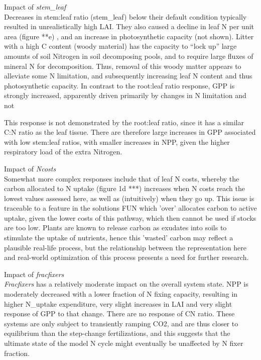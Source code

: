 \documentclass[draft,linenumbers]{agujournal}
\begin{document}
Impact of \emph{stem\_leaf}\\
Decreases in stem:leaf ratio (stem\_leaf) below their default condition typically resulted in unrealistically high LAI. They also caused a decline in leaf N per unit area (figure **e) , and an increase in photosynthetic capacity (not shown). Litter with a high C content (woody material) has the capacity to “lock up” large amounts of soil Nitrogen in soil decomposing pools, and to require large fluxes of mineral N for decomposition. Thus, removal of this woody matter appears to alleviate some N limitation, and subsequently increasing leaf N content and thus photosynthetic capacity.  In contrast to the root:leaf ratio response, GPP is strongly increased, apparently driven primarily by changes in N limitation and not 

This response is not demonstrated by the root:leaf ratio, since it has a similar C:N ratio as the leaf tissue. There are therefore large increases in GPP associated with low stem:leaf ratios, with smaller increases in NPP, given the higher respiratory load of the extra Nitrogen.

Impact of \emph{Ncosts}\\
Somewhat more complex responses include that of leaf N costs, whereby the carbon allocated to N uptake (figure 1d ***) increases when N costs reach the lowest values assessed here, as well as (intuitively) when they go up. This issue is traceable to a feature in the solutions FUN which 'over' allocates carbon to active uptake, given the lower costs of this pathway, which then cannot be used if stocks are too low. Plants are known to release carbon as exudates into soils to stimulate the uptake of nutrients, hence this 'wasted' carbon may reflect a plausible real-life process, but the relationship between the representation here and real-world optimization of this process presents a need for further research.

Impact of \emph{fracfixers}\\
\emph{Fracfixers} has a relatively moderate impact on the overall system state. NPP is moderately decreased with a lower fraction of N fixing capacity, resulting in higher N\_uptake expenditure, very slight increases in LAI and very slight response of GPP to that change. There are no response of CN ratio. These systems are only subject to transiently ramping CO2, and are thus closer to equilibrium than the step-change fertilizations, and this suggests that the ultimate state of the model N cycle might eventually be unaffected by N fixer fraction.
\end{document}
